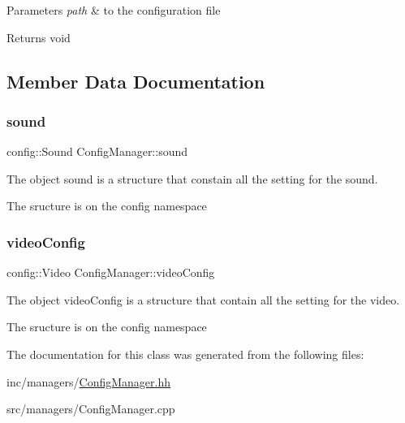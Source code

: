 \begin{DoxyParams}{Parameters}
{\em path} & to the configuration file \\
\hline
\end{DoxyParams}
\begin{DoxyReturn}{Returns}
void 
\end{DoxyReturn}


\subsection{Member Data Documentation}
\mbox{\label{classConfigManager_a010e2da02ebc90d7ce930d1c57a79e96}} 
\subsubsection{\texorpdfstring{sound}{sound}}
{\footnotesize\ttfamily config\+::\+Sound Config\+Manager\+::sound}



The object sound is a structure that constain all the setting for the sound. 

The sructure is on the config namespace \mbox{\label{classConfigManager_a1e0dbb8563b71871e6c68abce5620cd0}} 
\subsubsection{\texorpdfstring{video\+Config}{videoConfig}}
{\footnotesize\ttfamily config\+::\+Video Config\+Manager\+::video\+Config}



The object video\+Config is a structure that contain all the setting for the video. 

The sructure is on the config namespace 

The documentation for this class was generated from the following files\+:\begin{DoxyCompactItemize}
\item 
inc/managers/\hyperlink{ConfigManager_8hh}{Config\+Manager.\+hh}\item 
src/managers/Config\+Manager.\+cpp\end{DoxyCompactItemize}
